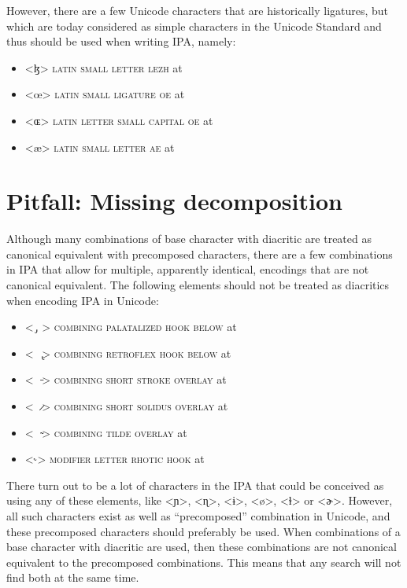 However, there are a few Unicode characters that are historically ligatures, but
which are today considered as simple characters in the Unicode Standard and thus
should be used when writing IPA, namely:

\begin{itemize}
	\item <ɮ> \textsc{latin small letter lezh} at  
	\item <œ> \textsc{latin small ligature oe} at  
	\item <ɶ> \textsc{latin letter small capital oe} at  
	\item <æ> \textsc{latin small letter ae} at  
\end{itemize}

\section{Pitfall: Missing decomposition}
\label{pitfall-missing-decomposition}

Although many combinations of base character with diacritic are treated as 
canonical equivalent with precomposed characters, there are a few combinations 
in IPA that allow for multiple, apparently identical, encodings that are not 
canonical equivalent. The following elements should not be treated as diacritics 
when encoding IPA in Unicode:
\begin{itemize}
  \item <\ {\large  ̡}\ > \textsc{combining palatalized hook below} at 
  \item <\ \ {\large  ̢}> \textsc{combining retroflex hook below} at 
  \item <\ \ {\large  ̵}> \textsc{combining short stroke overlay} at 
  \item <\ \ {\large  ̷}> \textsc{combining short solidus overlay} at 
  \item <\ \ {\large  ̴}> \textsc{combining tilde overlay} at 
  \item <{\large ˞}> \textsc{modifier letter rhotic hook} at 
\end{itemize} 

There turn out to be a lot of characters in the IPA that could be conceived as 
using any of these elements, like <ɲ>, <ɳ>, <ɨ>, <ø>, <ɫ> or <ɚ>. However, all 
such characters exist as well as ``precomposed'' combination in Unicode, and these 
precomposed characters should preferably be used. When combinations of a base 
character with diacritic are used, then these combinations are not canonical 
equivalent to the precomposed combinations. This means that any search will not 
find both at the same time.

